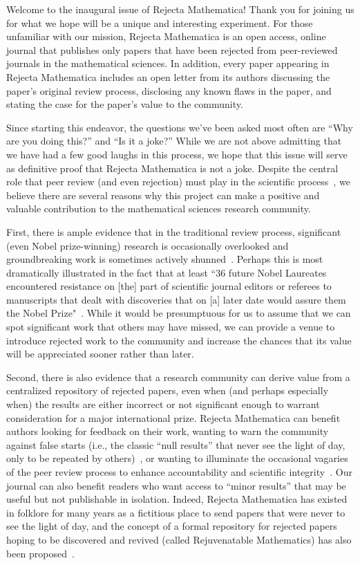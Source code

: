 \documentclass[12pt]{article}
\begin{document}
Welcome to the inaugural issue of Rejecta Mathematica! Thank you for
joining us for what we hope will be a unique and interesting
experiment. For those unfamiliar with our mission, Rejecta
Mathematica is an open access, online journal that publishes only
papers that have been rejected from peer-reviewed journals in the
mathematical sciences. In addition, every paper appearing in Rejecta
Mathematica includes an open letter from its authors discussing the
paper's original review process, disclosing any known flaws in the
paper, and stating the case for the paper's value to the community.

Since starting this endeavor, the questions we've been asked most
often are ``Why are you doing this?'' and ``Is it a joke?'' While we
are not above admitting that we have had a few good laughs in this
process, we hope that this issue will serve as definitive proof that
Rejecta Mathematica is not a joke. Despite the central role that
peer review (and even rejection) must play in the scientific
process~\cite{Fang05012008}, we believe there are several reasons
why this project can make a positive and valuable contribution to
the mathematical sciences research community.

First, there is ample evidence that in the traditional review
process, significant (even Nobel prize-winning) research is
occasionally overlooked and groundbreaking work is sometimes
actively
shunned~\cite{natureCoping,barber1961rss,Cam::1996::Have-referees}.
Perhaps this is most dramatically illustrated in the fact that at
least ``36 future Nobel Laureates encountered resistance on [the]
part of scientific journal editors or referees to manuscripts that
dealt with discoveries that on [a] later date would assure them the
Nobel Prize"~\cite{nodelrejected}. While it would be presumptuous
for us to assume that we can spot significant work that others may
have missed, we can provide a venue to introduce rejected work to
the community and increase the chances that its value will be
appreciated sooner rather than later.

Second, there is also evidence that a research community can derive
value from a centralized repository of rejected papers, even when
(and perhaps especially when) the results are either incorrect or
not significant enough to warrant consideration for a major
international prize. Rejecta Mathematica can benefit authors looking
for feedback on their work, wanting to warn the community against
false starts (i.e., the classic ``null results'' that never see the
light of day, only to be repeated by others)~\cite{stallings,jnrbm}, or
wanting to illuminate the occasional vagaries of the peer review
process to enhance accountability and scientific
integrity~\cite{philica}. Our journal can also benefit readers who
want access to ``minor results'' that may be useful but not
publishable in isolation. Indeed, Rejecta Mathematica has existed in
folklore for many years as a fictitious place to send papers that
were never to see the light of day, and the concept of a formal
repository for rejected papers hoping to be discovered and revived
(called Rejuvenatable Mathematics) has also been
proposed~\cite{Mag::1997::Theorems-that}.
\end{document}
